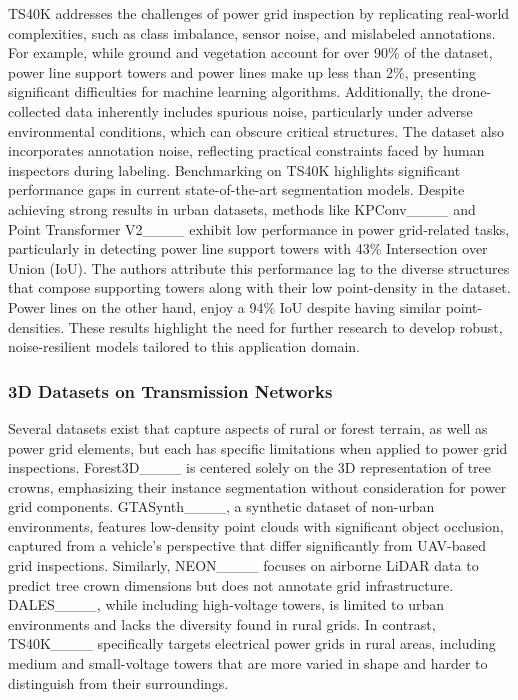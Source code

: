 TS40K addresses the challenges of power grid inspection by replicating real-world complexities, such as class imbalance, sensor noise, and mislabeled annotations. For example, while ground and vegetation account for over 90\% of the dataset, power line support towers and power lines make up less than 2\%, presenting significant difficulties for machine learning algorithms. 
Additionally, the drone-collected data inherently includes spurious noise, particularly under adverse environmental conditions, which can obscure critical structures. 
The dataset also incorporates annotation noise, reflecting practical constraints faced by human inspectors during labeling.
%
Benchmarking on TS40K highlights significant performance gaps in current state-of-the-art segmentation models. 
Despite achieving strong results in urban datasets, methods like KPConv____ and Point Transformer V2____ exhibit low performance in power grid-related tasks, particularly in detecting power line support towers with 43\% Intersection over Union (IoU).
The authors attribute this performance lag to the diverse structures that compose supporting towers along with their low point-density in the dataset. Power lines on the other hand, enjoy a 94\% IoU despite having similar point-densities.
These results highlight the need for further research to develop robust, noise-resilient models tailored to this application domain.


\subsubsection{3D Datasets on Transmission Networks}
Several datasets exist that capture aspects of rural or forest terrain, as well as power grid elements, but each has specific limitations when applied to power grid inspections. Forest3D____ is centered solely on the 3D representation of tree crowns, emphasizing their instance segmentation without consideration for power grid components. 
%
GTASynth____, a synthetic dataset of non-urban environments, features low-density point clouds with significant object occlusion, captured from a vehicle’s perspective that differ significantly from UAV-based grid inspections. 
Similarly, NEON____ focuses on airborne LiDAR data to predict tree crown dimensions but does not annotate grid infrastructure. DALES____, while including high-voltage towers, is limited to urban environments and lacks the diversity found in rural grids.
%
In contrast, TS40K____ specifically targets electrical power grids in rural areas, including medium and small-voltage towers that are more varied in shape and harder to distinguish from their surroundings.

